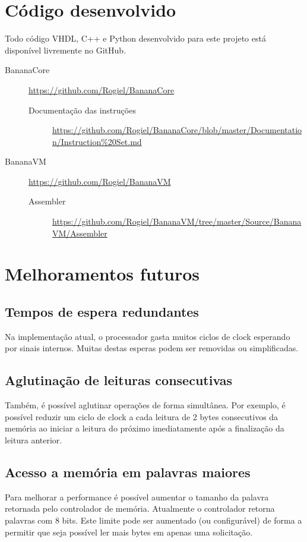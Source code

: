 \documentclass[11pt]{report}
\begin{document}
\chapter{Código desenvolvido}
\label{ch:Instruction documentation}
Todo código VHDL, C++ e Python desenvolvido para este projeto está disponível livremente no GitHub.

\begin{description}
	\item[BananaCore] \url{https://github.com/Rogiel/BananaCore}
	\begin{description}
		\item[Documentação das instruções] \url{https://github.com/Rogiel/BananaCore/blob/master/Documentation/Instruction%20Set.md}
	\end{description}
	
	\item[BananaVM] \url{https://github.com/Rogiel/BananaVM}
	\begin{description}
		\item[Assembler] \url{https://github.com/Rogiel/BananaVM/tree/master/Source/BananaVM/Assembler}
	\end{description}
\end{description}

\chapter{Melhoramentos futuros}
\section*{Tempos de espera redundantes}
Na implementação atual, o processador gasta muitos ciclos de clock esperando por sinais internos. Muitas destas esperas podem ser removidas ou simplificadas.

\section*{Aglutinação de leituras consecutivas}
Também, é possível aglutinar operações de forma simultânea. Por exemplo, é possível reduzir um ciclo de clock a cada leitura de 2 bytes consecutivos da memória ao iniciar a leitura do próximo imediatamente após a finalização da leitura anterior.

\section*{Acesso a memória em palavras maiores}
Para melhorar a performance é possível aumentar o tamanho da palavra retornada pelo controlador de memória. Atualmente o controlador retorna palavras com 8 bits. Este limite pode ser aumentado (ou configurável) de forma a permitir que seja possível ler mais bytes em apenas uma solicitação.
\end{document}
